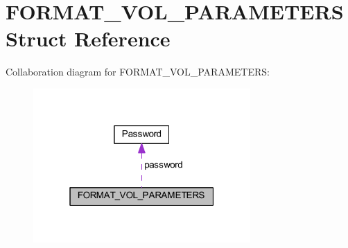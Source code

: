 \hypertarget{struct_f_o_r_m_a_t___v_o_l___p_a_r_a_m_e_t_e_r_s}{}\section{F\+O\+R\+M\+A\+T\+\_\+\+V\+O\+L\+\_\+\+P\+A\+R\+A\+M\+E\+T\+E\+RS Struct Reference}
\label{struct_f_o_r_m_a_t___v_o_l___p_a_r_a_m_e_t_e_r_s}


Collaboration diagram for F\+O\+R\+M\+A\+T\+\_\+\+V\+O\+L\+\_\+\+P\+A\+R\+A\+M\+E\+T\+E\+RS\+:
\nopagebreak
\begin{figure}[H]
\begin{center}
\leavevmode
\includegraphics[width=235pt]{struct_f_o_r_m_a_t___v_o_l___p_a_r_a_m_e_t_e_r_s__coll__graph}
\end{center}
\end{figure}
